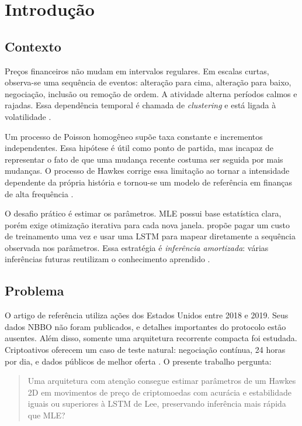 \documentclass[12pt,a4paper,openany]{report}
\begin{document}
\tableofcontents
\listoftables
\listoffigures
\clearpage
{}

\chapter{Introdução}

\section{Contexto}

Preços financeiros não mudam em intervalos regulares. Em escalas curtas, observa-se
uma sequência de eventos: alteração para cima, alteração para baixo, negociação,
inclusão ou remoção de ordem. A atividade alterna períodos calmos e rajadas. Essa
dependência temporal é chamada de \emph{clustering} e está ligada à volatilidade
\citep{bouchaud2018}.

Um processo de Poisson homogêneo supõe taxa constante e incrementos independentes.
Essa hipótese é útil como ponto de partida, mas incapaz de representar o fato de que
uma mudança recente costuma ser seguida por mais mudanças. O processo de Hawkes
\citep{hawkes1971,hawkes1971b} corrige essa limitação ao tornar a intensidade
dependente da própria história e tornou-se um modelo de referência em finanças de
alta frequência \citep{bacry2015,hawkes2018}.

O desafio prático é estimar os parâmetros. MLE possui base estatística clara, porém
exige otimização iterativa para cada nova janela. \citet{lee2023} propõe pagar um custo
de treinamento uma vez e usar uma LSTM para mapear diretamente a sequência observada
nos parâmetros. Essa estratégia é \emph{inferência amortizada}: várias inferências
futuras reutilizam o conhecimento aprendido \citep{cranmer2020}.

\section{Problema}

O artigo de referência utiliza ações dos Estados Unidos entre 2018 e 2019. Seus dados
NBBO não foram publicados, e detalhes importantes do protocolo estão ausentes. Além
disso, somente uma arquitetura recorrente compacta foi estudada. Criptoativos oferecem
um caso de teste natural: negociação contínua, 24 horas por dia, e dados públicos de
melhor oferta \citep{makarov2020}. O presente trabalho pergunta:

\begin{quote}
Uma arquitetura com atenção consegue estimar parâmetros de um Hawkes 2D em movimentos
de preço de criptomoedas com acurácia e estabilidade iguais ou superiores à LSTM de
Lee, preservando inferência mais rápida que MLE?
\end{quote}
\end{document}
